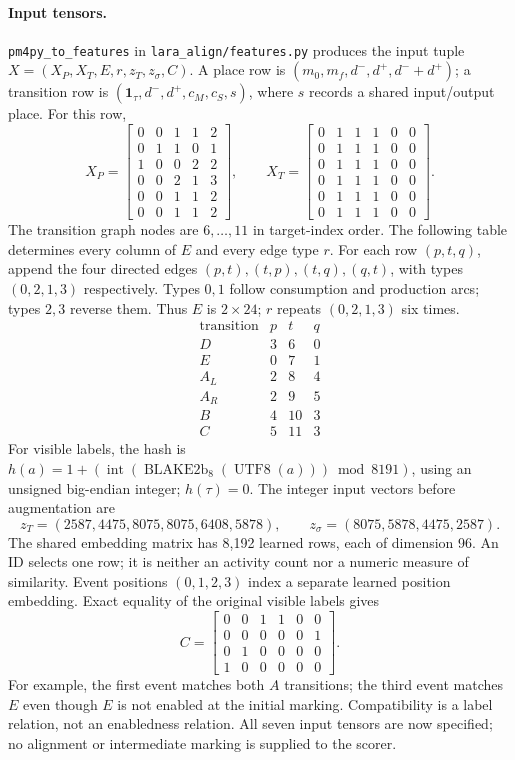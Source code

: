 \documentclass[11pt]{article}
\begin{document}
\paragraph{Input tensors.}
\texttt{pm4py\_to\_features} in \texttt{lara\_align/features.py} produces the
input tuple $X=(X_P,X_T,E,r,z_T,z_\sigma,C)$. A place row is
$(m_0,m_f,d^-,d^+,d^-+d^+)$; a transition row is
$(\mathbf{1}_{\tau},d^-,d^+,c_M,c_S,s)$, where $s$ records a shared input/output
place. For this row,
\[
 X_P=\begin{bmatrix}
 0&0&1&1&2\\0&1&1&0&1\\1&0&0&2&2\\
 0&0&2&1&3\\0&0&1&1&2\\0&0&1&1&2
 \end{bmatrix},\qquad
 X_T=\begin{bmatrix}
 0&1&1&1&0&0\\0&1&1&1&0&0\\0&1&1&1&0&0\\
 0&1&1&1&0&0\\0&1&1&1&0&0\\0&1&1&1&0&0
 \end{bmatrix}.
\]
The transition graph nodes are $6,\ldots,11$ in target-index order. The
following table determines every column of $E$ and every edge type $r$.
For each row $(p,t,q)$, append the four directed edges
$(p,t),(t,p),(t,q),(q,t)$, with types $(0,2,1,3)$ respectively. Types $0,1$
follow consumption and production arcs; types $2,3$ reverse them. Thus $E$ is $2\times24$; $r$ repeats $(0,2,1,3)$ six times.
\[
\begin{array}{c|rrr}
\text{transition}&p&t&q\\\hline
D&3&6&0\\ E&0&7&1\\ A_L&2&8&4\\ A_R&2&9&5\\
B&4&10&3\\ C&5&11&3
\end{array}
\]
For visible labels, the hash is
$h(a)=1+(\operatorname{int}(\operatorname{BLAKE2b}_8(\operatorname{UTF8}(a)))
\bmod8191)$, using an unsigned big-endian integer; $h(\tau)=0$. The integer
input vectors before augmentation are
\[
 z_T=(2587,4475,8075,8075,6408,5878),\qquad
 z_\sigma=(8075,5878,4475,2587).
\]
The shared embedding matrix has 8{,}192 learned rows, each of dimension 96.
An ID selects one row; it is neither an activity count nor a numeric measure
of similarity. Event positions $(0,1,2,3)$ index a separate learned position
embedding. Exact equality of the original visible labels gives
\[
 C=\begin{bmatrix}
 0&0&1&1&0&0\\0&0&0&0&0&1\\0&1&0&0&0&0\\1&0&0&0&0&0
 \end{bmatrix}.
\]
For example, the first event matches both $A$ transitions; the third event
matches $E$ even though $E$ is not enabled at the initial marking. Compatibility
is a label relation, not an enabledness relation. All seven input tensors are
now specified; no alignment or intermediate marking is supplied to the scorer.
\end{document}

